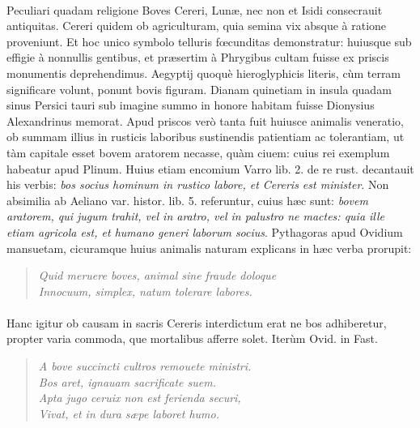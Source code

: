 \documentclass[a4paper, 11pt, oneside, polutonikogreek, latin]{article}
\begin{document}
\paragraph{}
Peculiari quadam religione Boves Cereri, Lunæ, nec non et Isidi consecrauit antiquitas. Cereri quidem ob agriculturam, quia semina vix absque à ratione proveniunt. Et hoc unico symbolo telluris fœcunditas demonstratur: huiusque sub effigie à nonnullis gentibus, et præsertim à Phrygibus cultam fuisse ex priscis monumentis deprehendimus. Aegyptij quoquè hieroglyphicis literis, cùm terram significare volunt, ponunt bovis figuram. Dianam quinetiam in insula quadam sinus Persici tauri sub imagine summo in honore habitam fuisse Dionysius Alexandrinus memorat. Apud priscos verò tanta fuit huiusce animalis veneratio, ob summam illius in rusticis laboribus sustinendis patientiam ac tolerantiam, ut tàm capitale esset bovem aratorem necasse, quàm ciuem: cuius rei exemplum habeatur apud Plinum. Huius etiam encomium Varro lib. 2. de re rust. decantauit his verbis: \emph{bos socius hominum in rustico labore, et Cereris est minister}. Non absimilia ab Aeliano var. histor. lib. 5. referuntur, cuius hæc sunt: \emph{bovem aratorem, qui jugum trahit, vel in aratro, vel in palustro ne mactes: quia ille etiam agricola est, et humano generi laborum socius}. Pythagoras apud Ovidium mansuetam, cicuramque huius animalis naturam explicans in hæc verba prorupit:
\begin{quote}
\emph{Quid meruere boves, animal sine fraude doloque}\\
\emph{Innocuum, simplex, natum tolerare labores.}\\
\end{quote}
\vspace*{-8mm}
\paragraph{}
Hanc igitur ob causam in sacris Cereris interdictum erat ne bos adhiberetur, propter varia commoda, que mortalibus afferre solet. Iterùm Ovid. in Fast.
\begin{quote}
\emph{A bove succincti cultros remouete ministri.}\\
\hspace*{10mm}\emph{Bos aret, ignauam sacrificate suem.}\\
\emph{Apta jugo ceruix non est ferienda securi,}\\
\hspace*{10mm}\emph{Vivat, et in dura sæpe laboret humo.}\\
\end{quote}
\vspace*{-8mm}
\end{document}
